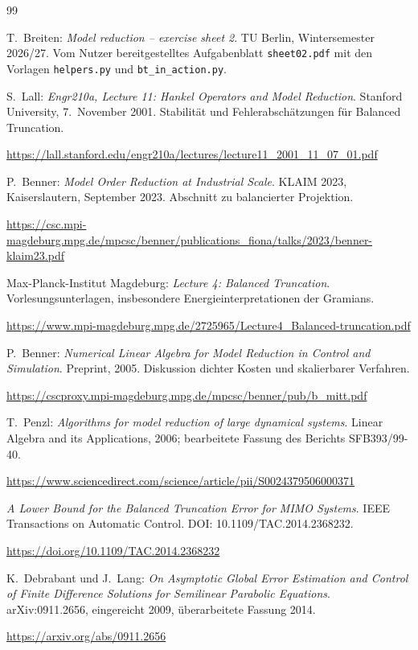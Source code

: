 \begin{thebibliography}{99}
\raggedright
{} T.~Breiten: \emph{Model reduction -- exercise sheet 2}. TU Berlin, Wintersemester 2026/27. Vom Nutzer bereitgestelltes Aufgabenblatt \texttt{sheet02.pdf} mit den Vorlagen \texttt{helpers.py} und \texttt{bt\_in\_action.py}.

 S.~Lall: \emph{Engr210a, Lecture 11: Hankel Operators and Model Reduction}. Stanford University, 7.~November 2001. Stabilität und Fehlerabschätzungen für Balanced Truncation.\par
\url{https://lall.stanford.edu/engr210a/lectures/lecture11_2001_11_07_01.pdf}

 P.~Benner: \emph{Model Order Reduction at Industrial Scale}. KLAIM 2023, Kaiserslautern, September 2023. Abschnitt zu balancierter Projektion.\par
\url{https://csc.mpi-magdeburg.mpg.de/mpcsc/benner/publications_fiona/talks/2023/benner-klaim23.pdf}

 Max-Planck-Institut Magdeburg: \emph{Lecture 4: Balanced Truncation}. Vorlesungsunterlagen, insbesondere Energieinterpretationen der Gramians.\par
\url{https://www.mpi-magdeburg.mpg.de/2725965/Lecture4_Balanced-truncation.pdf}

 P.~Benner: \emph{Numerical Linear Algebra for Model Reduction in Control and Simulation}. Preprint, 2005. Diskussion dichter Kosten und skalierbarer Verfahren.\par
\url{https://cscproxy.mpi-magdeburg.mpg.de/mpcsc/benner/pub/b_mitt.pdf}

 T.~Penzl: \emph{Algorithms for model reduction of large dynamical systems}. Linear Algebra and its Applications, 2006; bearbeitete Fassung des Berichts SFB393/99-40.\par
\url{https://www.sciencedirect.com/science/article/pii/S0024379506000371}

 \emph{A Lower Bound for the Balanced Truncation Error for MIMO Systems}. IEEE Transactions on Automatic Control. DOI: 10.1109/TAC.2014.2368232.\par
\url{https://doi.org/10.1109/TAC.2014.2368232}

 K.~Debrabant und J.~Lang: \emph{On Asymptotic Global Error Estimation and Control of Finite Difference Solutions for Semilinear Parabolic Equations}. arXiv:0911.2656, eingereicht 2009, überarbeitete Fassung 2014.\par
\url{https://arxiv.org/abs/0911.2656}


\end{thebibliography}
